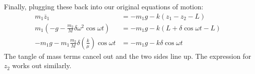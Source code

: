 \documentclass[12pt]{article}
\begin{document}
{Finally, plugging these back into our original equations of motion:
\begin{align*}
    m_1 \ddot{z_1} &= -m_1 g - k \left( z_1 - z_2 - L\right) \\
    m_1 \left( -g - \frac{m_2}{M} \delta \omega^2 \cos \omega t \right) &= 
    -m_1 g - k \left( L + \delta \cos \omega t - L \right) \\
    -m_1 g - m_1 \frac{m_2}{M} \delta \left( \frac{k}{\mu} \right) \cos \omega t &= 
    -m_1 g - k \delta \cos \omega t
\end{align*}
The tangle of mass terms cancel out and the two sides line up. The expression for $z_2$ works out similarly.





}
\end{document}
